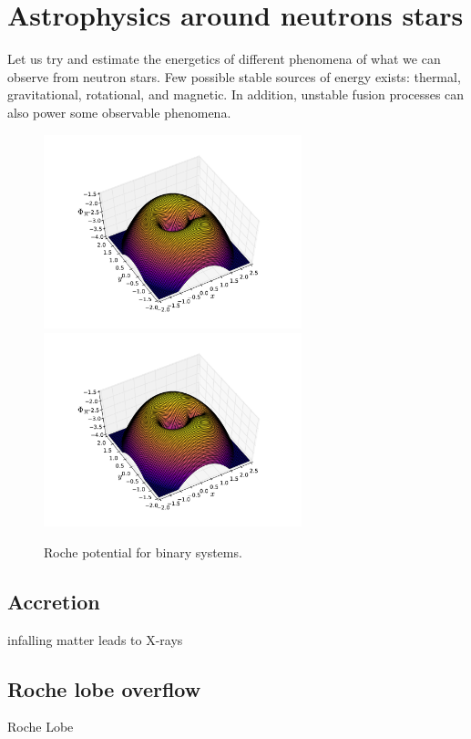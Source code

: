 \chapter{Astrophysics around neutrons stars}


Let us try and estimate the energetics of different phenomena of what we can observe from neutron stars.
Few possible stable sources of energy exists: thermal, gravitational, rotational, and magnetic.
In addition, unstable fusion processes can also power some observable phenomena.




\begin{figure}[t]
\centering
\includegraphics[width=7.5cm]{figs/astro/roche.pdf}
\includegraphics[width=7.5cm]{figs/astro/roche.pdf}
\caption{\label{fig:roche}
Roche potential for binary systems.
}
\end{figure}

\section{Accretion}
infalling matter leads to X-rays \cite{Lewin93}


\section{Roche lobe overflow}
Roche Lobe \cite{PRP02} \cite{LL15}


